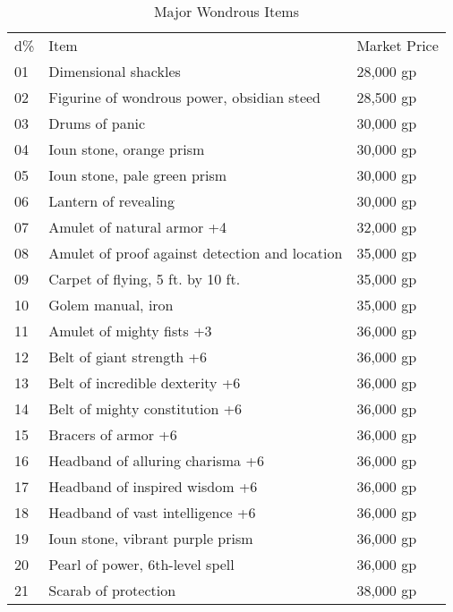 \begin{table}[]
\sffamily
\caption{Major Wondrous Items}
\begin{tabular}{lll}
d\% & Item                                           & Market Price \\
01  & Dimensional shackles                           & 28,000 gp    \\
02  & Figurine of wondrous power, obsidian steed     & 28,500 gp    \\
03  & Drums of panic                                 & 30,000 gp    \\
04  & Ioun stone, orange prism                       & 30,000 gp    \\
05  & Ioun stone, pale green prism                   & 30,000 gp    \\
06  & Lantern of revealing                           & 30,000 gp    \\
07  & Amulet of natural armor +4                     & 32,000 gp    \\
08  & Amulet of proof against detection and location & 35,000 gp    \\
09  & Carpet of flying, 5 ft. by 10 ft.              & 35,000 gp    \\
10  & Golem manual, iron                             & 35,000 gp    \\
11  & Amulet of mighty fists +3                      & 36,000 gp    \\
12  & Belt of giant strength +6                      & 36,000 gp    \\
13  & Belt of incredible dexterity +6                & 36,000 gp    \\
14  & Belt of mighty constitution +6                 & 36,000 gp    \\
15  & Bracers of armor +6                            & 36,000 gp    \\
16  & Headband of alluring charisma +6               & 36,000 gp    \\
17  & Headband of inspired wisdom +6                 & 36,000 gp    \\
18  & Headband of vast intelligence +6               & 36,000 gp    \\
19  & Ioun stone, vibrant purple prism               & 36,000 gp    \\
20  & Pearl of power, 6th-level spell                & 36,000 gp    \\
21  & Scarab of protection                           & 38,000 gp    \\

\end{tabular}
\end{table}
